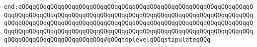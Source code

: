 \verb|end;qQQqqQQqqQQqqQQqqQQqqQQqqQQqqQQqqQQqqQQqqQQqqQQqqQQqqQQqqQQqqQQqqQQqqQQqqQQqqQQqqQQqqQQqqQQqqQQqqQQqqQQqqQQqqQQqqQQqqQQqqQQqqQQqqQQqqQQqqQQqqQQqqQQqqQQqqQQqqQQqqQQqqQQqqQQqqQQqqQQqqQQqqQQqqQQqqQQqqQQqqQQqqQQqqQQqqQQqqQQqqQQqqQQqqQQqqQQqqQQqqQQqqQQqqQQqqQQqqQQqqQQqqQQqqQQqqQQqqQQqqQQqqQQqqQQqqQQqqQQqqQQq#qQQqtoplevelqQQqstipulateqQQq|\newline
\newline
\newline

